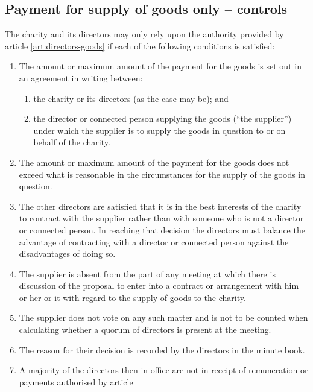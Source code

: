 \begin{enumerate}
\begin{enumerate}
    \subsection{Payment for supply of goods only – controls}
    \label{goods}
    \label{scls:supply-goods} The charity and its directors may only
    rely upon the authority provided by article
    \ref{art:directors-goods} if each of the following conditions is
    satisfied:
    \begin{enumerate}
    \item
      The amount or maximum amount of the payment for the goods is set
      out in an agreement in writing between:
      \begin{enumerate}
      \item
        the charity or its directors (as the case may be); and
      \item
        the director or connected person supplying the goods
        (``the supplier'') under which the supplier is to supply the goods
        in question to or on behalf of the charity.
      \end{enumerate}
    \item
      The amount or maximum amount of the payment for the goods does not
      exceed what is reasonable in the circumstances for the supply of
      the goods in question.
    \item
      The other directors are satisfied that it is in the best interests
      of the charity to contract with the supplier rather than with
      someone who is not a director or connected person. In reaching that
      decision the directors must balance the advantage of contracting
      with a director or connected person against the disadvantages of
      doing so.
    \item
      The supplier is absent from the part of any meeting at which there
      is discussion of the proposal to enter into a contract or
      arrangement with him or her or it with regard to the supply of
      goods to the charity.
    \item
      The supplier does not vote on any such matter and is not to be
      counted when calculating whether a quorum of directors is present
      at the meeting.
    \item
      The reason for their decision is recorded by the directors in the
      minute book.
    \item
      A majority of the directors then in office are not in receipt of
      remuneration or payments authorised by article

\end{enumerate}
\end{enumerate}
\end{enumerate}
